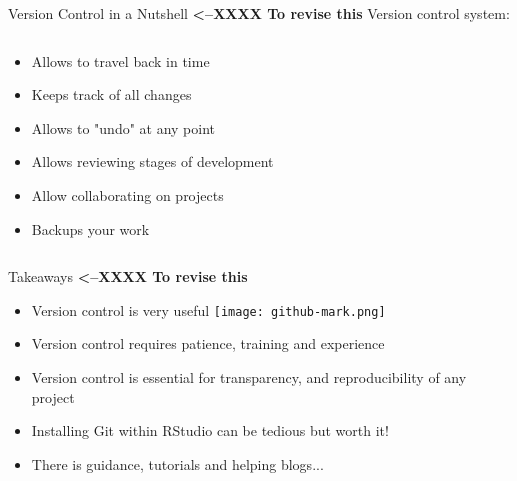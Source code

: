 \documentclass[xcolor=x11names,compress]{beamer}
\renewcommand{\(}{\begin{columns}}
\renewcommand{\)}{\end{columns}}
\newcommand{\<}[1]{\begin{column}{#1}}
\renewcommand{\>}{\end{column}}
\begin{document}
\begin{frame}{Version Control in a Nutshell \textcolor[rgb]{1.00,0.00,0.00}{\textbf{<--XXXX To revise this}} }
Version control system:
\begin{columns}[t]
\begin{column}{0.6\textwidth}
\begin{itemize}[<+->]
    \item Allows to travel back in time
    \item Keeps track of all changes
    \item Allows to "undo" at any point
    \item Allows reviewing stages of development
    \item Allow collaborating on projects
    \item Backups your work
  \end{itemize}
 \end{column}
  \begin{column}{0.4\textwidth}
    \begin{center}
    \begin{itemize}
    \end{itemize}
    \end{center}
  \end{column}
\end{columns}
\end{frame}


\begin{frame}{Takeaways \textcolor[rgb]{1.00,0.00,0.00}{\textbf{<--XXXX To revise this}} }
\pause

\begin{itemize}[<+->]
    \item Version control is very useful \texttt{[image: github-mark.png]}
    \item Version control requires patience, training and experience
    \item Version control is essential for transparency, and reproducibility of any project
    \item Installing Git within RStudio can be tedious but worth it!
    \item There is guidance, tutorials and helping blogs...
\end{itemize}
\end{frame}
\end{document}
